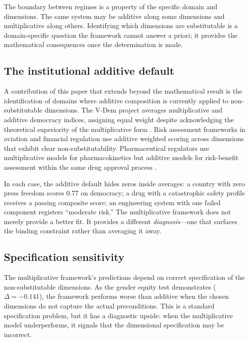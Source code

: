 \documentclass[12pt, a4paper]{article}
\theoremstyle{definition}
\theoremstyle{remark}
\begin{document}
The boundary between regimes is a property of the specific domain and dimensions. The same system may be additive along some dimensions and multiplicative along others. Identifying which dimensions are substitutable is a domain-specific question the framework cannot answer a priori; it provides the mathematical consequences once the determination is made.

\subsection{The institutional additive default}

A contribution of this paper that extends beyond the mathematical result is the identification of domains where additive composition is currently applied to non-substitutable dimensions. The V-Dem project averages multiplicative and additive democracy indices, assigning equal weight despite acknowledging the theoretical superiority of the multiplicative form \cite{coppedge2018}. Risk assessment frameworks in aviation and financial regulation use additive weighted scoring across dimensions that exhibit clear non-substitutability. Pharmaceutical regulators use multiplicative models for pharmacokinetics but additive models for risk-benefit assessment within the same drug approval process \cite{fda2003}.

In each case, the additive default hides zeros inside averages: a country with zero press freedom scores 0.77 on democracy; a drug with a catastrophic safety profile receives a passing composite score; an engineering system with one failed component registers ``moderate risk.'' The multiplicative framework does not merely provide a better fit. It provides a different \textit{diagnosis}---one that surfaces the binding constraint rather than averaging it away.

\subsection{Specification sensitivity}

The multiplicative framework's predictions depend on correct specification of the non-substitutable dimensions. As the gender equity test demonstrates ($\Delta = -0.141$), the framework performs worse than additive when the chosen dimensions do not capture the actual preconditions. This is a standard specification problem, but it has a diagnostic upside: when the multiplicative model underperforms, it signals that the dimensional specification may be incorrect.
\end{document}
